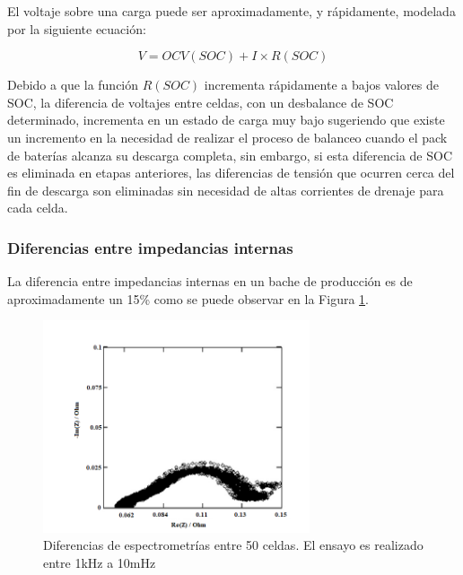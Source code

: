 \documentclass[10pt,a4paper]{article}
\begin{document}
	\noindent El voltaje sobre una carga puede ser aproximadamente, y rápidamente, modelada por la siguiente ecuación:
	
	\begin{equation}
		V = OCV(SOC) + I \times R(SOC)
		\label{v_load_bat}
	\end{equation}
	
	\noindent Debido a que la función $R(SOC)$ incrementa rápidamente a bajos valores de SOC, la diferencia de voltajes entre celdas, con un desbalance de SOC determinado, incrementa en un estado de carga muy bajo sugeriendo que existe un incremento en la necesidad de realizar el proceso de balanceo cuando el pack de baterías alcanza su descarga completa, sin embargo, si esta diferencia de SOC es eliminada en etapas anteriores, las diferencias de tensión que ocurren cerca del fin de descarga son eliminadas sin necesidad de altas corrientes de drenaje para cada celda.
	
	\subsubsection{Diferencias entre impedancias internas}
	
	La diferencia entre impedancias internas en un bache de producción es de aproximadamente un 15\% como se puede observar en la Figura \ref{zin_diff}.
	
	\begin{figure}[h!]
		\begin{center}
			\includegraphics[width=0.7\textwidth]{zin_diff.png}
			\caption{Diferencias de espectrometrías entre 50 celdas. El ensayo es realizado entre 1kHz a 10mHz}
			\label{zin_diff}
		\end{center}
	\end{figure}
	\FloatBarrier
\end{document}
